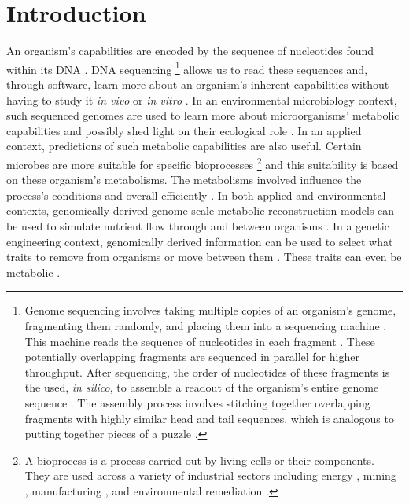 \chapter{Introduction}

An organism's capabilities are encoded by the sequence of nucleotides found within its DNA \cite{crick1970central}. DNA sequencing \footnote{Genome sequencing involves taking multiple copies of an organism's genome, fragmenting them randomly, and placing them into a sequencing machine \cite{shendure2017dna}. This machine reads the sequence of nucleotides in each fragment \cite{shendure2017dna}. These potentially overlapping fragments are sequenced in parallel for higher throughput. After sequencing, the order of nucleotides of these fragments is the used, \textit{in silico}, to assemble a readout of the organism's entire genome sequence \cite{wajid2012review}. The assembly process involves stitching together overlapping fragments with highly similar head and tail sequences, which is analogous to putting together pieces of a puzzle \cite{wajid2012review}.} allows us to read these sequences and, through software, learn more about an organism's inherent capabilities without having to study it \textit{in vivo} or \textit{in vitro} \cite{de2012bioinformatic}. In an environmental microbiology context, such sequenced genomes are used to learn more about microorganisms' metabolic capabilities and possibly shed light on their ecological role \cite{de2012bioinformatic}. In an applied context, predictions of such metabolic capabilities are also useful. Certain microbes are more suitable for specific bioprocesses \footnote{A bioprocess is a process carried out by living cells or their components. They are used across a variety of industrial sectors including energy \cite{deublein2011biogas}, mining \cite{dew1997biox}, manufacturing \cite{thodey2014microbial}, and environmental remediation \cite{alexander1999biodegradation}.} and this suitability is based on these organism's metabolisms. The metabolisms involved influence the process's conditions and overall efficiently \cite{doran1995bioprocess,liu2016bioprocess}. In both applied and environmental contexts, genomically derived genome-scale metabolic reconstruction models can be used to simulate nutrient flow through and between organisms \cite{magnusdottir2017generation, arkin2018kbase, faria2018improving}. In a genetic engineering context, genomically derived information can be used to select what traits to remove from organisms or move between them \cite{strohl2001biochemical}. These traits can even be metabolic \cite{sanchez2005novel}.

